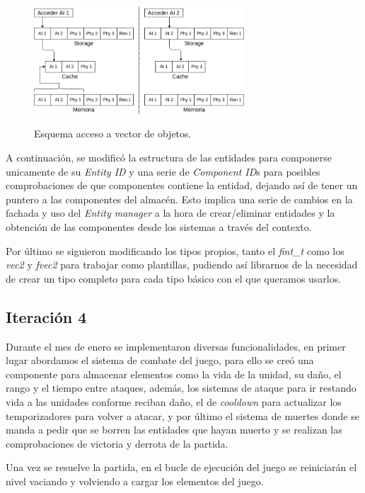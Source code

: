 \begin{figure}[hbt]
\centering
\includegraphics[width=0.7\textwidth]{imagenes/diario_desarrollo/memoria1.png}\\
\caption{Esquema acceso a vector de objetos.}
\label{fig:memoria_obj}
\end{figure}

A continuación, se modificó la estructura de las entidades para componerse unicamente de su
\textit{Entity ID} y una serie de \textit{Component ID}s para posibles comprobaciones de que
componentes contiene la entidad, dejando así de tener un puntero a las componentes del almacén.
Esto implica una serie de cambios en la fachada y uso del \textit{Entity manager} a la hora
de crear/eliminar entidades y la obtención de las componentes desde los sistemas a través del
contexto. 

Por último se siguieron modificando los tipos propios, tanto el \textit{fint\_t} como
los \textit{vec2} y \textit{fvec2} para trabajar como plantillas, pudiendo así librarnos de
la necesidad de crear un tipo completo para cada tipo básico con el que queramos usarlos.

\subsection*{Iteración 4}
Durante el mes de enero se implementaron diversas funcionalidades, en primer lugar abordamos
el sistema de combate del juego, para ello se creó una componente para almacenar elementos como
la vida de la unidad, su daño, el rango y el tiempo entre ataques, además, los sistemas de 
ataque para ir restando vida a las unidades conforme reciban daño, el de \textit{cooldown} para
actualizar los temporizadores para volver a atacar, y por último el sistema de muertes donde se
manda a pedir que se borren las entidades que hayan muerto y se realizan las comprobaciones 
de victoria y derrota de la partida.

Una vez se resuelve la partida, en el bucle de ejecución del juego se reiniciarán el nivel
vaciando y volviendo a cargar los elementos del juego.

